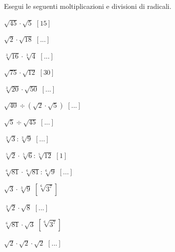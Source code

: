 

\subsubsection*{}

\begin{esercizio}[\Ast]
 \label{ese:2.32}
Esegui le seguenti moltiplicazioni e divisioni di radicali.
 \begin{multicols}{3}
 \begin{enumeratea}
 \item $\sqrt{45}\cdot \sqrt 5$
  \hfill $\left[15\right]$
 \item $\sqrt 2\cdot \sqrt{18}$
  \hfill $\left[...\right]$
 \item $\sqrt[3]{16}\cdot \sqrt[3]4$
  \hfill $\left[...\right]$
 \item $\sqrt{75}\cdot \sqrt{12}$
  \hfill $\left[30\right]$
 \item $\sqrt[3]{20}\cdot \sqrt{50}$
  \hfill $\left[...\right]$
 \item $\sqrt{40}\div(\sqrt{2}\cdot \sqrt{5})$
  \hfill $\left[...\right]$
 \item $\sqrt{5} \div \sqrt{45}$
  \hfill $\left[...\right]$
 \item $\sqrt[3]3:\sqrt[3]9$
  \hfill $\left[...\right]$
 \item $\sqrt[5]2\cdot \sqrt[5]6:\sqrt[5]{12}$
  \hfill $\left[1\right]$
 \item $\sqrt[6]{81}\cdot \sqrt[6]{81}:\sqrt[6]9$
  \hfill $\left[...\right]$
 \item $\sqrt 3\cdot \sqrt[3]9$
  \hfill $\left[\sqrt[6]{3^7}\right]$
 \item $\sqrt[3]2\cdot \sqrt 8$
  \hfill $\left[...\right]$
 \item $\sqrt[6]{81}\cdot \sqrt 3$
  \hfill $\left[\sqrt[6]{3^7}\right]$
 \item $\sqrt 2\cdot \sqrt 2\cdot\sqrt 2$
  \hfill $\left[...\right]$
 \end{enumeratea}
 \end{multicols}
\end{esercizio}


